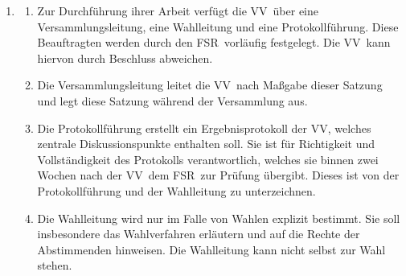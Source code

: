\documentclass[a4paper, 12pt]{article}
\newcommand{\vv}{VV}
\newcommand{\rat}{FSR}
\begin{document}
\begin{enumerate}[leftmargin=0cm]
	\item {}\label{BeauftragteVV}
	\begin{enumerate}[leftmargin=0cm]
		\item Zur Durchführung ihrer Arbeit verfügt die \vv~über
		eine Versammlungsleitung,
		eine Wahlleitung und
		eine Protokollführung. Diese Beauftragten werden durch den \rat~vorläufig festgelegt. Die \vv~kann hiervon durch Beschluss abweichen.
		\item Die Versammlungsleitung leitet die \vv~nach Maßgabe dieser Satzung  und legt diese Satzung während der Versammlung aus.
		\item Die Protokollführung erstellt ein Ergebnisprotokoll der \vv, welches zentrale Diskussionspunkte enthalten soll. Sie ist für Richtigkeit und Vollständigkeit des Protokolls verantwortlich, welches sie binnen zwei Wochen nach der \vv~dem \rat~zur Prüfung übergibt. Dieses ist von der Protokollführung und der Wahlleitung zu unterzeichnen.
		\item Die Wahlleitung wird nur  im Falle von Wahlen explizit bestimmt.  Sie soll insbesondere das Wahlverfahren erläutern und auf die Rechte der Abstimmenden hinweisen. Die Wahlleitung kann nicht selbst zur Wahl stehen.
	\end{enumerate} 

	\newpage

	\cc{Fachschaftsrat (\rat)}


\end{enumerate}
\end{document}
